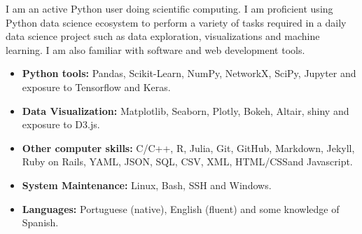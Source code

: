 \documentclass[12pt,a4paper,roman]{moderncv}        %
\begin{document}
\vspace{6pt}
I am an active Python user doing scientific computing. I am proficient using Python data science ecosystem to perform a variety of tasks required in a daily data science project such as data exploration, visualizations and machine learning. I am also familiar with software and web development tools. 
\vspace{6pt}
\begin{itemize}

\item \textbf{Python tools:} Pandas, Scikit-Learn, NumPy, NetworkX, SciPy, Jupyter and exposure to Tensorflow and Keras.

\vspace{6pt}

\item \textbf{Data Visualization:} Matplotlib, Seaborn, Plotly, Bokeh, Altair, shiny and exposure to D3.js.

\vspace{6pt}

\item \textbf{Other computer skills:} C/C++, R, Julia, Git, GitHub, Markdown, Jekyll, Ruby on Rails, YAML, JSON, SQL, CSV, XML, HTML/CSSand  Javascript.

\vspace{6pt}

\item \textbf{System Maintenance:} Linux, Bash, SSH and Windows.

\vspace{6pt}

\item \textbf{Languages:} Portuguese (native), English (fluent) and some knowledge of Spanish.

\end{itemize}
\end{document}
